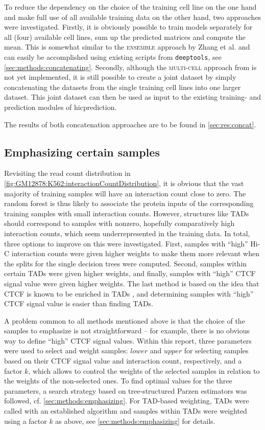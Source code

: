 To reduce the dependency on the choice of the training cell line on the one hand 
and make full use of all available training data on the other hand,
two approaches were investigated.
Firstly, it is obviously possible to train models separately for all (four)
available cell lines, sum up the predicted matrices and compute the mean.
This is somewhat similar to the \textsc{ensemble} approach by Zhang et al. \cite{Zhang2019}
and can easily be accomplished using existing scripts from \texttt{deeptools}, see \autoref{sec:methods:concatenating}.
Secondly, although the \textsc{multi-cell} approach from \cite{Zhang2019} is not yet implemented,
it is still possible to create a joint dataset by simply concatenating the datasets from the single training 
cell lines into one larger dataset.
This joint dataset can then be used as input to the existing training- and prediction modules of hicprediction.

The results of both concatenation approaches are to be found in \autoref{sec:res:concat}.

\subsection{Emphasizing certain samples}
Revisiting the read count distribution in \autoref{fig:GM12878:K562:interactionCountDistribution},
it is obvious that the vast majority of training samples
will have an interaction count close to zero. 
The random forest is thus likely to associate the protein inputs of the corresponding training samples
with small interaction counts.
However, structures like TADs should correspond to samples with nonzero, hopefully comparatively high 
interaction counts, which seem underrepresented in the training data.
In total, three options to improve on this were investigated.
First, samples with ``high'' Hi-C interaction counts were given higher weights
to make them more relevant when the splits for the single decision trees were computed.
Second, samples within certain TADs were given higher weights, and finally, 
samples with ``high'' CTCF signal value were given higher weights.
The last method is based on the idea that CTCF is known to be enriched in TADs \cite{Lee2012},
and determining samples with ``high'' CTCF signal value is easier than finding TADs.

A problem common to all methods mentioned above is that the choice of the samples to emphasize is 
not straightforward -- for example, there is no obvious way to define ``high'' CTCF signal values.
Within this report, three parameters were used to select and weight samples: $lower$ and $upper$ for
selecting samples based on their CTCF signal value and interaction count, respectively, and a factor $k$, which 
allows to control the weights of the selected samples in relation to the weights of the non-selected ones.
To find optimal values for the three parameters, a search strategy based on tree-structured Parzen estimators
was followed, cf. \autoref{sec:methods:emphasizing}.
For TAD-based weighting, TADs were called with an established algorithm and samples within TADs were 
weighted using a factor $k$ as above, see \autoref{sec:methods:emphasizing} for details.

